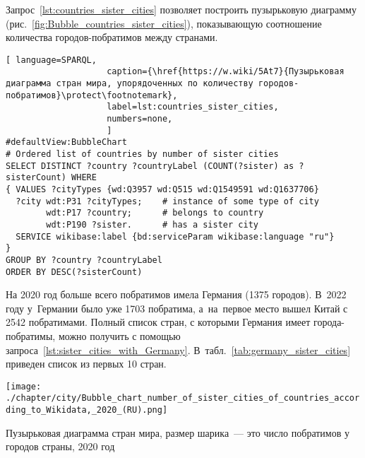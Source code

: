 Запрос~\ref{lst:countries_sister_cities} позволяет построить 
пузырьковую диаграмму (рис.~\ref{fig:Bubble_countries_sister_cities}), 
показывающую соотношение количества городов-побратимов между странами.

\begin{lstlisting}[ language=SPARQL, 
                    caption={\href{https://w.wiki/5At7}{Пузырьковая диаграмма стран мира, упорядоченных по количеству городов-побратимов}\protect\footnotemark},
                    label=lst:countries_sister_cities,
                    numbers=none,
                    ]
#defaultView:BubbleChart
# Ordered list of countries by number of sister cities
SELECT DISTINCT ?country ?countryLabel (COUNT(?sister) as ?sisterCount) WHERE
{ VALUES ?cityTypes {wd:Q3957 wd:Q515 wd:Q1549591 wd:Q1637706}
  ?city wdt:P31 ?cityTypes;    # instance of some type of city
        wdt:P17 ?country;      # belongs to country
        wdt:P190 ?sister.      # has a sister city
  SERVICE wikibase:label {bd:serviceParam wikibase:language "ru"}
}
GROUP BY ?country ?countryLabel
ORDER BY DESC(?sisterCount)
\end{lstlisting}

На 2020 год больше всего побратимов имела Германия (\num{1375} городов). 
В~2022 году у~Германии было уже 1703 побратима, 
а~на~первое место вышел Китай с 2542 побратимами. 
Полный список стран, с которыми Германия имеет города-побратимы, можно получить с помощью запроса~\ref{lst:sister_cities_with_Germany}. 
В~табл.~\ref{tab:germany_sister_cities} приведен список из первых 10 стран.
%
\begin{marginfigure}[-1.5cm]
    \texttt{[image: ./chapter/city/Bubble\_chart\_number\_of\_sister\_cities\_of\_countries\_according\_to\_Wikidata,\_2020\_(RU).png]}
\caption[Пузырьковая диаграмма стран мира по числу побратимов у городов, 2020 год.]{Пузырьковая диаграмма стран мира, размер шарика~--- это число \mbox{побратимов} у городов страны, 2020 год}%
  \label{fig:Bubble_countries_sister_cities}%
\end{marginfigure}



